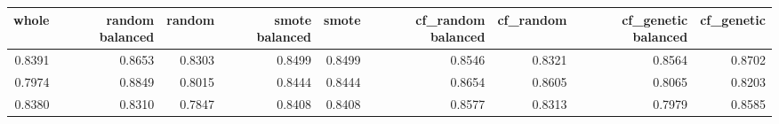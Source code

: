 \begin{tabular}{rrrrrrrrr}
\toprule

 whole &  random balanced &  random &  smote balanced &  smote &  cf\_random balanced &  cf\_random &  cf\_genetic balanced &  cf\_genetic \\
\midrule

0.8391 &           0.8653 &  0.8303 &          0.8499 & 0.8499 &              0.8546 &     0.8321 &               0.8564 &      0.8702 \\
0.7974 &           0.8849 &  0.8015 &          0.8444 & 0.8444 &              0.8654 &     0.8605 &               0.8065 &      0.8203 \\
0.8380 &           0.8310 &  0.7847 &          0.8408 & 0.8408 &              0.8577 &     0.8313 &               0.7979 &      0.8585 \\

\bottomrule
\end{tabular}
